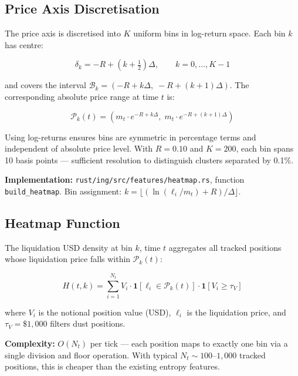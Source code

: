 \documentclass[11pt,a4paper]{article}
\begin{document}
\subsection{Price Axis Discretisation}

The price axis is discretised into $K$ uniform bins in log-return space. Each bin $k$ has centre:

\begin{equation}
\delta_k = -R + \left(k + \tfrac{1}{2}\right)\Delta, \qquad k = 0, \ldots, K-1
\end{equation}

and covers the interval $\mathcal{B}_k = \left(-R + k\Delta,\; -R + (k+1)\Delta\right)$. The corresponding absolute price range at time $t$ is:

\begin{equation}
\mathcal{P}_k(t) = \left(m_t \cdot e^{-R + k\Delta},\; m_t \cdot e^{-R + (k+1)\Delta}\right)
\end{equation}

Using log-returns ensures bins are symmetric in percentage terms and independent of absolute price level. With $R = 0.10$ and $K = 200$, each bin spans 10 basis points --- sufficient resolution to distinguish clusters separated by 0.1\%.

\textbf{Implementation:} \texttt{rust/ing/src/features/heatmap.rs}, function \texttt{build\_heatmap}. Bin assignment: $k = \lfloor (\ln(\ell_i / m_t) + R) / \Delta \rfloor$.

\subsection{Heatmap Function}

The liquidation USD density at bin $k$, time $t$ aggregates all tracked positions whose liquidation price falls within $\mathcal{P}_k(t)$:

\begin{equation}
\boxed{H(t, k) = \sum_{i=1}^{N_t} V_i \cdot \mathbf{1}\!\left[\ell_i \in \mathcal{P}_k(t)\right] \cdot \mathbf{1}\!\left[V_i \geq \tau_V\right]}
\end{equation}

where $V_i$ is the notional position value (USD), $\ell_i$ is the liquidation price, and $\tau_V = \$1{,}000$ filters dust positions.

\textbf{Complexity:} $O(N_t)$ per tick --- each position maps to exactly one bin via a single division and floor operation. With typical $N_t \sim 100$--$1{,}000$ tracked positions, this is cheaper than the existing entropy features.
\end{document}

